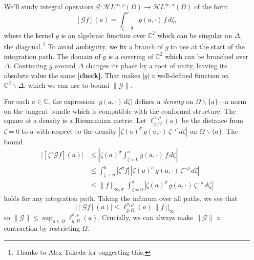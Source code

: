 \documentclass{article}
\newcommand{\maps}{\colon}
\newcommand{\C}{\mathbb{C}}
\newcommand{\holoL}[1]{\mathcal{H}L^{#1}} %
\begin{document}
We'll study integral operators $\mathcal{G} \maps \holoL{\infty, \rho}(\Omega) \to \holoL{\infty, \sigma}(\Omega)$ of the form
\[ [\mathcal{G}f](a) = \int_{\zeta = 0}^{a} g(a, \cdot)\,f\,d\zeta, \]
where the kernel $g$ is an algebraic function over $\C^2$ which can be singular on $\Delta$, the diagonal.\footnote{Thanks to Alex Takeda for suggesting this.} To avoid ambiguity, we fix a branch of $g$ to use at the start of the integration path. The domain of $g$ is a covering of $\C^2$ which can be branched over $\Delta$. Continuing $g$ around $\Delta$ changes its phase by a root of unity, leaving its absolute value the same \textbf{[check]}. That makes $|g|$ a well-defined function on $\C^2 \smallsetminus \Delta$, which we can use to bound $\|\mathcal{G}\|$.

For each $a \in \C$, the expression $|g(a, \cdot)\,d\zeta|$ defines a {\em density} on $\Omega \smallsetminus \{a\}$---a norm on the tangent bundle which is compatible with the conformal structure. The square of a density is a Riemannian metric. Let $\ell^{\sigma, \rho}_{g, \Omega}(a)$ be the distance from $\zeta = 0$ to $a$ with respect to the density $|\zeta(a)^\sigma\,g(a, \cdot)\,\zeta^{-\rho}\,d\zeta|$ on $\Omega \smallsetminus \{a\}$. The bound
\begin{align*}
\big|[\zeta^\sigma \mathcal{G}f](a)\big| & \le \left| \zeta(a)^\sigma \int_{\zeta = 0}^{a} g(a, \cdot)\,f\,d\zeta \right| \\
& \le \int_{\zeta = 0}^{a} |\zeta^\sigma f|\,|\zeta(a)^\sigma\,g(a, \cdot)\,\zeta^{-\rho}\,d\zeta| \\
& \le \|f\|_{\infty, \sigma} \int_{\zeta = 0}^{a} |\zeta(a)^\sigma\,g(a, \cdot)\,\zeta^{-\rho}\,d\zeta|
\end{align*}
holds for any integration path. Taking the infimum over all paths, we see that
\[ \big|[\mathcal{G}f](a)\big| \le \ell^{\sigma, \rho}_{g, \Omega}(a)\,\|f\|_\infty. \]
so $\|\mathcal{G}\| \le \sup_{a \in \Omega} \ell^{\sigma, \rho}_{g, \Omega}(a)$. Crucially, we can always make $\|\mathcal{G}\|$ a contraction by restricting $\Omega$.
\end{document}
